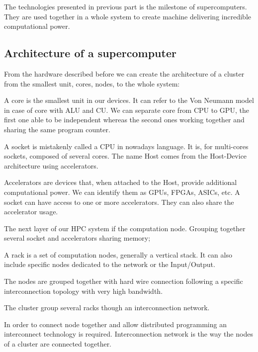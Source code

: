 The technologies presented in previous part is the milestone of supercomputers. 
They are used together in a whole system to create machine delivering incredible computational power.

\subsection{Architecture of a supercomputer}
From the hardware described before we can create the architecture of a cluster from the smallest unit, cores, nodes, to the whole system: 

\begin{description}
\item[Core:] A core is the smallest unit in our devices. 
It can refer to the Von Neumann model in case of core with ALU and CU. 
We can separate core from CPU to GPU, the first one able to be independent whereas the second ones working together and sharing the same program counter. 
\item[Socket/Host:] A socket is mistakenly called a CPU in nowadays language. It is, for multi-cores sockets, composed of several cores. The name Host comes from the Host-Device architecture using accelerators. 
\item[Accelerators/Devices:] Accelerators are devices that, when attached to the Host, provide additional computational power. 
We can identify them as GPUs, FPGAs, ASICs, etc. 
A socket can have access to one or more accelerators.
They can also share the accelerator usage. 
\item[Computation node: ] The next layer of our HPC system if the computation node. Grouping together several socket and accelerators sharing memory;
\item[Rack: ] A rack is a set of computation nodes, generally a vertical stack. 
It can also include specific nodes dedicated to the network or the Input/Output.
\item[Interconnection: ] The nodes are grouped together with hard wire connection following a specific interconnection topology with very high bandwidth.
\item[System/Cluster/Supercomputer] The cluster group several racks though an interconnection network.
\end{description}

In order to connect node together and allow distributed programming an interconnect technology is required. 
Interconnection network is the way the nodes of a cluster are connected together. 


